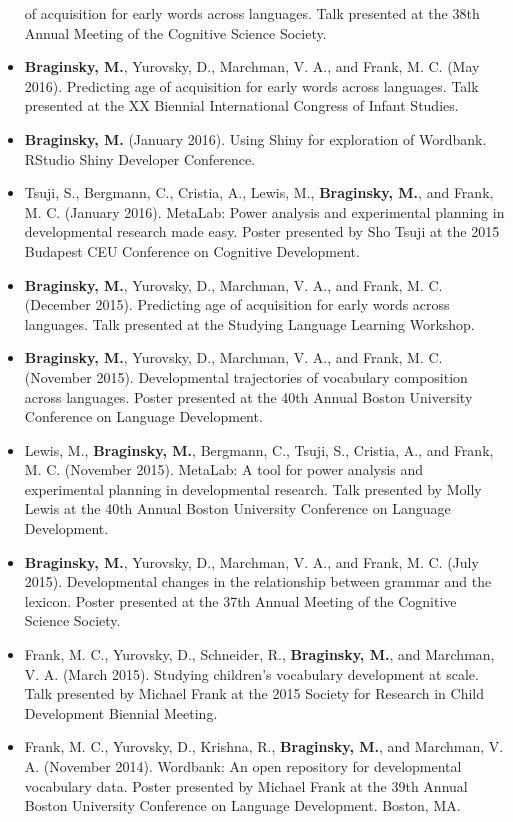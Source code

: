 \documentclass[11pt,]{article}
\begin{document}
\begin{itemize}
  of acquisition for early words across languages. Talk presented at the
  38th Annual Meeting of the Cognitive Science Society.
\item
  \textbf{Braginsky, M.}, Yurovsky, D., Marchman, V. A., and Frank, M.
  C. (May 2016). Predicting age of acquisition for early words across
  languages. Talk presented at the XX Biennial International Congress of
  Infant Studies.
\item
  \textbf{Braginsky, M.} (January 2016). Using Shiny for exploration of
  Wordbank. RStudio Shiny Developer Conference.
\item
  Tsuji, S., Bergmann, C., Cristia, A., Lewis, M., \textbf{Braginsky,
  M.}, and Frank, M. C. (January 2016). MetaLab: Power analysis and
  experimental planning in developmental research made easy. Poster
  presented by Sho Tsuji at the 2015 Budapest CEU Conference on
  Cognitive Development.
\item
  \textbf{Braginsky, M.}, Yurovsky, D., Marchman, V. A., and Frank, M.
  C. (December 2015). Predicting age of acquisition for early words
  across languages. Talk presented at the Studying Language Learning
  Workshop.
\item
  \textbf{Braginsky, M.}, Yurovsky, D., Marchman, V. A., and Frank, M.
  C. (November 2015). Developmental trajectories of vocabulary
  composition across languages. Poster presented at the 40th Annual
  Boston University Conference on Language Development.
\item
  Lewis, M., \textbf{Braginsky, M.}, Bergmann, C., Tsuji, S., Cristia,
  A., and Frank, M. C. (November 2015). MetaLab: A tool for power
  analysis and experimental planning in developmental research. Talk
  presented by Molly Lewis at the 40th Annual Boston University
  Conference on Language Development.
\item
  \textbf{Braginsky, M.}, Yurovsky, D., Marchman, V. A., and Frank, M.
  C. (July 2015). Developmental changes in the relationship between
  grammar and the lexicon. Poster presented at the 37th Annual Meeting
  of the Cognitive Science Society.
\item
  Frank, M. C., Yurovsky, D., Schneider, R., \textbf{Braginsky, M.}, and
  Marchman, V. A. (March 2015). Studying children's vocabulary
  development at scale. Talk presented by Michael Frank at the 2015
  Society for Research in Child Development Biennial Meeting.
\item
  Frank, M. C., Yurovsky, D., Krishna, R., \textbf{Braginsky, M.}, and
  Marchman, V. A. (November 2014). Wordbank: An open repository for
  developmental vocabulary data. Poster presented by Michael Frank at
  the 39th Annual Boston University Conference on Language Development.
  Boston, MA.
\end{itemize}
\end{document}
